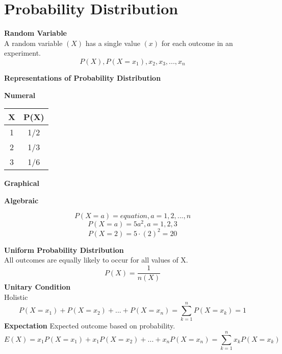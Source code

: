 \documentclass{article}
\begin{document}
\section{Probability Distribution}
\textbf{Random Variable}\\
A random variable \((X)\) has a single value \((x)\) for each outcome in an experiment.
\[P(X), P(X=x_1),x_2,x_3,...,x_n\]
\begin{center}
    \textbf{Representations of Probability Distribution}\\
\end{center}
\begin{minipage}[t]{0.3333\textwidth}
\begin{center}
    \textbf{Numeral}
\end{center}
\begin{center}
\def\arraystretch{1}
{\setlength{\tabcolsep}{1em}
\begin{tabular}{| c | c |} 
 \hline
   \textbf{X} & \textbf{P(X)}\\ 
 \hline
1   & 1\slash 2 \\
 \hline
2    & 1\slash 3 \\
 \hline
3	& 1\slash 6 \\
 \hline
\end{tabular}}
\end{center}
\end{minipage}%
\begin{minipage}[t]{0.3333\textwidth}
\begin{center}
    \textbf{Graphical}
\end{center}
\begin{center}
\end{center}
\end{minipage}
\begin{minipage}[t]{0.3333\textwidth}
\begin{center}
    \textbf{Algebraic}
\end{center}
\[P(X = a) = equation, a = 1, 2,...,n\]
\[P(X = a) = 5a^2, a = 1, 2, 3\]
\[P(X= 2) = 5 \cdot (2)^2 = 20\]
\end{minipage}
\textbf{Uniform Probability Distribution}\\
All outcomes are equally likely to occur for all values of X.
\[P(X) = \frac{1}{n(X)}\]
\textbf{Unitary Condition}\\
Holistic
\[P(X=x_1)+P(X=x_2)+...+P(X=x_n) = \sum_{k=1}^{n}P(X=x_k) = 1\]
\textbf{Expectation}
Expected outcome based on probability.
\[E(X) = x_1P(X=x_1)+x_1P(X=x_2)+...+x_nP(X=x_n) = \sum_{k=1}^{n}x_kP(X=x_k)\]
\end{document}
